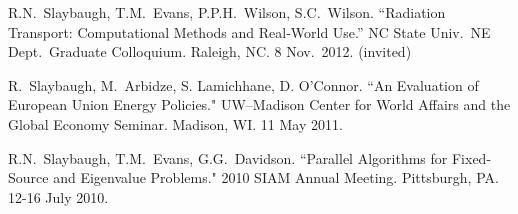 \begin{bibsection}
\item R.N.\ Slaybaugh, T.M.\ Evans, P.P.H.\ Wilson, S.C.\ Wilson. ``Radiation Transport: Computational Methods and Real-World Use.'' NC State Univ.\ NE Dept.\ Graduate Colloquium. Raleigh, NC. 8 Nov.\ 2012. (invited)


\item R.\ Slaybaugh, M.\ Arbidze, S. Lamichhane, D. O'Connor. ``An Evaluation of European Union Energy Policies." UW--Madison Center for World Affairs and the Global Economy Seminar. Madison, WI. 11 May 2011.


\item R.N.\ Slaybaugh, T.M.\ Evans, G.G.\ Davidson. ``Parallel Algorithms for Fixed-Source and Eigenvalue Problems." 2010 SIAM Annual Meeting. Pittsburgh, PA. 12-16 July 2010.



\end{bibsection}


